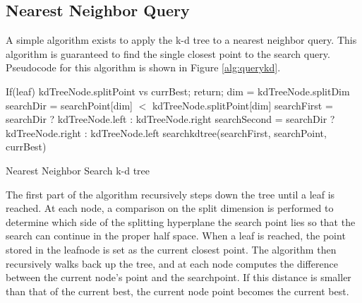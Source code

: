 \subsection{Nearest Neighbor Query}

A simple algorithm exists to apply the k-d tree to a nearest neighbor query.  This algorithm is guaranteed to find the single closest point to the search query.  Pseudocode for this algorithm is shown in Figure \ref{alg:querykd}.

\begin{algorithm}
\begin{algorithmic}
	\State If(leaf) kdTreeNode.splitPoint vs currBest; return;
	\State dim = kdTreeNode.splitDim
	\State searchDir = searchPoint[dim] $<$ kdTreeNode.splitPoint[dim]
	\State searchFirst = searchDir ? kdTreeNode.left : kdTreeNode.right
	\State searchSecond = searchDir ? kdTreeNode.right : kdTreeNode.left
	\State searchkdtree(searchFirst, searchPoint, currBest)
	\State

\EndFunction
\end{algorithmic}
\caption{Nearest Neighbor Search k-d tree}
\label{alg:querykd}
\end{algorithm}

The first part of the algorithm recursively steps down the tree until a leaf is reached.  At each node, a comparison on the split dimension is performed to determine which side of the splitting hyperplane the search point lies so that the search can continue in the proper half space.  When a leaf is reached, the point stored in the leafnode is set as the current closest point.  The algorithm then recursively walks back up the tree, and at each node computes the difference between the current node's point and the searchpoint.  If this distance is smaller than that of the current best, the current node point becomes the current best.

